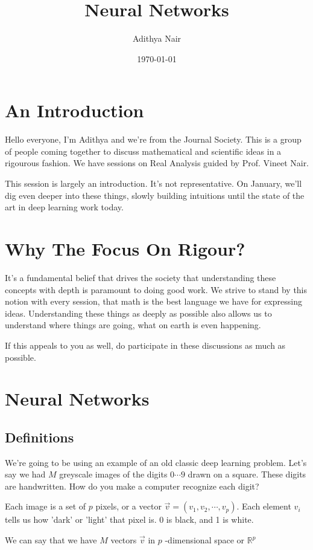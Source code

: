 \documentclass[11pt]{article}
\author{Adithya Nair}
\date{\today}
\title{Neural Networks}
\begin{document}
\maketitle
\tableofcontents

\section{An Introduction}
\label{sec:orgb6da60e}
Hello everyone, I'm Adithya and we're from the Journal Society. This is a group of people coming together to discuss mathematical and scientific ideas in a rigourous fashion. We have sessions on Real Analysis guided by Prof. Vineet Nair.

This session is largely an introduction. It's not representative. On January, we'll dig even deeper into these things, slowly building intuitions until the state of the art in deep learning work today.
\section{Why The Focus On Rigour?}
\label{sec:orgea1b91c}
It's a fundamental belief that drives the society that understanding these concepts with depth is paramount to doing good work. We strive to stand by this notion with every session, that math is the best language we have for expressing ideas. Understanding these things as deeply as possible also allows us to understand where things are going, what on earth is even happening.

If this appeals to you as well, do participate in these discussions as much as possible.
\section{Neural Networks}
\label{sec:org9255b8a}
\subsection{Definitions}
\label{sec:org61e42f6}
We're going to be using an example of an old classic deep learning problem. Let's say we had \(M\) greyscale images of the digits \(0\cdots9\) drawn on a square. These digits are handwritten. How do you make a computer recognize each digit?

Each image is a set of \(p\) pixels, or a vector \(\vec{v} = (v_1, v_2, \cdots , v_p)\). Each element \(v_i\) tells us how 'dark' or 'light' that pixel is. 0 is black, and 1 is white.

We can say that we have \(M\) vectors \(\vec{v}\) in \(p\) -dimensional space or \(\mathbb{R}^{p}\)
\end{document}
